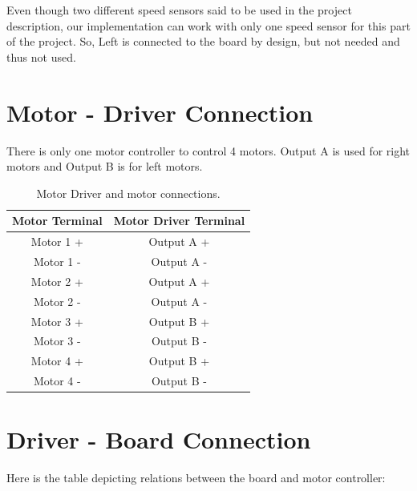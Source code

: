 \documentclass[12pt]{article}
\begin{document}
Even though two different speed sensors said to be used in the project description, our implementation can work with only one speed sensor for this part of the project. So, Left is connected to the board by design, but not needed and thus not used.


\newpage
\section{Motor - Driver Connection}

There is only one motor controller to control 4 motors. Output A is used for right motors and Output B is for left motors.

\begin {table}[H]
\begin{center}
\begin{tabular}{|c|c|}
\hline
Motor Terminal & Motor Driver Terminal \\\hline
Motor 1 + & Output A + \\\hline
Motor 1 - & Output A - \\\hline
Motor 2 + & Output A + \\\hline
Motor 2 - & Output A - \\\hline
Motor 3 + & Output B + \\\hline
Motor 3 - & Output B - \\\hline
Motor 4 + & Output B + \\\hline
Motor 4 - & Output B - \\\hline
\end{tabular}
\caption{Motor Driver and motor connections.}
\end{center}
\end{table}


\newpage
\section{Driver - Board Connection}

Here is the table depicting relations between the board and motor controller:
\end{document}
